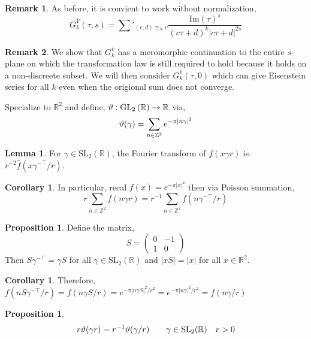 \documentclass{article}
\newcommand{\SL}[2]{\mathrm{SL}_{#1}(#2)}
\newcommand{\GL}[2]{\mathrm{GL}_{#1}\left(#2\right)}
\newcommand{\Z}{\mathbb{Z}}
\newcommand{\R}{\mathbb{R}}
\renewcommand{\Im}[1]{\mathrm{Im}(#1)}
\theoremstyle{definition}
\newtheorem{lemma}[theorem]{Lemma}
\newtheorem{proposition}[theorem]{Proposition}
\newtheorem{corollary}[theorem]{Corollary}
\newtheorem{remark}{Remark}[section]
\newenvironment{definition}[1][Definition:]{\begin{trivlist}
\item[\hskip \labelsep {\bfseries #1}]}{\end{trivlist}}
\begin{document}
\begin{remark}
As before, it is convient to work without normalization,
\[ G^{\bar{V}}_k(\tau, s) = \sum'_{(c,d) \equiv_N v} \frac{\Im{\tau}^s}{(c \tau + d)^k |c \tau + d|^{2 s}} \]
\end{remark}

\begin{remark}
We show that $G^{\bar{v}}_k$ has a meromorphic continuation to the entire $s$-plane on which the transformation law is still required to hold because it holds on a non-discreete subset. We will then consider $G^{\bar{v}}_k(\tau, 0)$ which can give Eisenstein series for all $k$ even when the origional sum does not converge.
\end{remark}

\begin{definition}
Specialize to $\R^2$ and define, $\vt : \GL{2}{\R} \to \R$ via,
\[ \vt(\gamma) = \sum_{n \in \Z^2} e^{-\pi |n \gamma|^2} \]
\end{definition}

\begin{lemma}
For $\gamma \in \SL{2}{\R}$, the Fourier transform of $f(x \gamma r)$ is $r^{-2} \hat{f}(x \gamma^{- \top} / r)$.
\end{lemma}

\begin{corollary}
In particular, recal $f(x) = e^{- \pi |x|^2}$ then via Poisson summation,
\[ r \sum_{n \in \Z^2} f(n \gamma r) =r^{-1} \sum_{n \in \Z^2} f(n \gamma^{- \top} / r) \]
\end{corollary}

\begin{proposition}
Define the matrix,
\[ S = \begin{pmatrix}
0 & - 1
\\
1 & 0
\end{pmatrix} \]
Then $S \gamma^{- \top} = \gamma S$ for all $\gamma \in \SL{2}{\R}$ and $|x S| = |x|$ for all $x \in \R^2$.
\end{proposition}

\begin{corollary}
Therefore, $f(n S \gamma^{- \top } / r) = f(n \gamma S / r) = e^{- \pi |n \gamma S|^2 / r^2} = e^{ - \pi |n \gamma|^2 / r^2} = f(n \gamma / r)$
\end{corollary}

\begin{proposition}
\[ r \vt(\gamma r) = r^{-1} \vt(\gamma / r) \quad \quad \gamma \in \SL{2}{\R} \quad r > 0 \]
\end{proposition}
 
\end{document}
